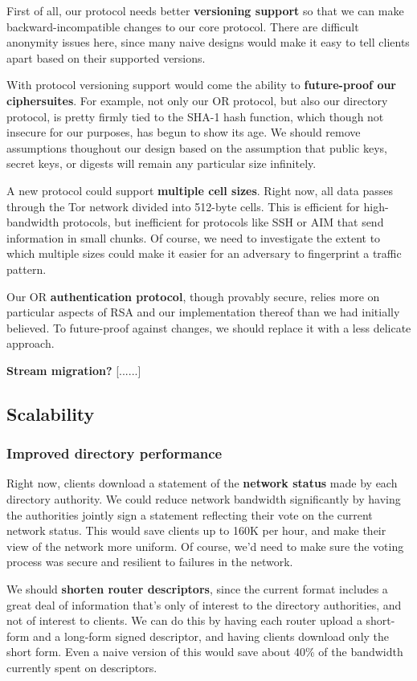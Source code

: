 \documentclass{article}
\newcommand{\tmp}[1]{{\bf #1} [......] \\}
\begin{document}
First of all, our protocol needs better {\bf versioning support} so that we
can make backward-incompatible changes to our core protocol.  There are
difficult anonymity issues here, since many naive designs would make it easy
to tell clients apart based on their supported versions.

With protocol versioning support would come the ability to {\bf future-proof
  our ciphersuites}.  For example, not only our OR protocol, but also our
directory protocol, is pretty firmly tied to the SHA-1 hash function, which
though not insecure for our purposes, has begun to show its age.  We should
remove assumptions thoughout our design based on the assumption that public
keys, secret keys, or digests will remain any particular size infinitely.

A new protocol could support {\bf multiple cell sizes}.  Right now, all data
passes through the Tor network divided into 512-byte cells.  This is
efficient for high-bandwidth protocols, but inefficient for protocols
like SSH or AIM that send information in small chunks.  Of course, we need to
investigate the extent to which multiple sizes could make it easier for an
adversary to fingerprint a traffic pattern.

Our OR {\bf authentication protocol}, though provably
secure\cite{goldberg-tap}, relies more on particular aspects of RSA and our
implementation thereof than we had initially believed.  To future-proof
against changes, we should replace it with a less delicate approach.

\tmp{Stream migration?}

\subsection{Scalability}

\subsubsection{Improved directory performance}
Right now, clients download a statement of the {\bf network status} made by
each directory authority.  We could reduce network bandwidth significantly by
having the authorities jointly sign a statement reflecting their vote on the
current network status.  This would save clients up to 160K per hour, and
make their view of the network more uniform.  Of course, we'd need to make
sure the voting process was secure and resilient to failures in the network.

We should {\bf shorten router descriptors}, since the current format includes
a great deal of information that's only of interest to the directory
authorities, and not of interest to clients.  We can do this by having each
router upload a short-form and a long-form signed descriptor, and having
clients download only the short form.  Even a naive version of this would
save about 40\% of the bandwidth currently spent on descriptors.
\end{document}
